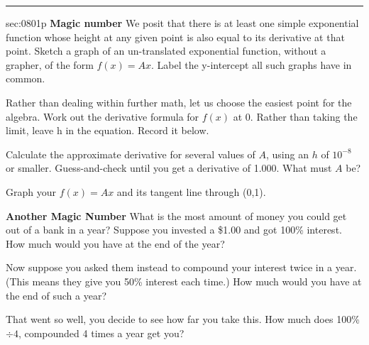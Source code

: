 \renewcommand{\columnseprule}{1.5pt}
\begin{multicols*}{2}
\rule[0.5\baselineskip]{0.4\textwidth}{1pt}
\noindent
{}\label{sec:0801p}
\begin{exercises}{sec:0801p}
\lab{} \textbf{Magic number}  We posit that there is at least one simple exponential function whose height at any given point is also equal to its derivative at that point.  Sketch a graph of an un-translated exponential function, without a grapher, of the form $f(x)=Ax$.  Label the y-intercept all such graphs have in common.

\vspace{4cm}
\lab{}  Rather than dealing within further math, let us choose the easiest point for the algebra.  Work out the derivative formula for $f(x)$ at 0.  Rather than taking the limit, leave h in the equation.  Record it below.

\vspace{3cm}
\lab{} Calculate the approximate derivative for several values of $A$, using an $h$ of $10^{-8}$ or smaller.  Guess-and-check until you get a derivative of 1.000.  What must $A$ be?

\vspace{3cm}
\lab{} Graph your $f(x)=Ax$ and its tangent line through (0,1).

\noindent
\begin{centering}
\end{centering}

\lab \textbf{Another Magic Number}  What is the most amount of money you could get out of a bank in a year?  Suppose you invested a \$1.00 and got 100\% interest.  How much would you have at the end of the year?


\vspace{1cm}
\lab{} Now suppose you asked them instead to compound your interest twice in a year.  (This means they give you 50\% interest each time.)  How much would you have at the end of such a year?

\vspace{1cm}
\lab{} That went so well, you decide to see how far you take this.  How much does 100\%$\div 4$, compounded 4 times a year get you?


\end{exercises}
\end{multicols*}
